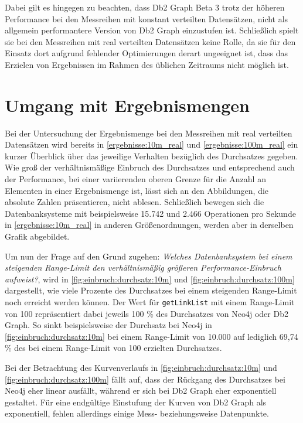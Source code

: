 Dabei gilt es hingegen zu beachten, dass Db2 Graph Beta 3 trotz der höheren Performance bei den Messreihen mit konstant verteilten Datensätzen, nicht als allgemein performantere Version von Db2 Graph einzustufen ist. Schließlich spielt sie bei den Messreihen mit real verteilten Datensätzen keine Rolle, da sie für den Einsatz dort aufgrund fehlender Optimierungen derart ungeeignet ist, dass das Erzielen von Ergebnissen im Rahmen des üblichen Zeitraums nicht möglich ist.

\section{Umgang mit Ergebnismengen}
\label{auswertung:ergebnismenge}
Bei der Untersuchung der Ergebnismenge bei den Messreihen mit real verteilten Datensätzen wird bereits in \autoref{ergebnisse:10m_real} und \ref{ergebnisse:100m_real} ein kurzer Überblick über das jeweilige Verhalten bezüglich des Durchsatzes gegeben. Wie groß der verhältnismäßige Einbruch des Durchsatzes und entsprechend auch der Performance, bei einer variierenden oberen Grenze für die Anzahl an Elementen in einer Ergebnismenge ist, lässt sich an den Abbildungen, die absolute Zahlen präsentieren, nicht ablesen. Schließlich bewegen sich die Datenbanksysteme mit beispielsweise 15.742 und 2.466 Operationen pro Sekunde in \autoref{ergebnisse:10m_real} in anderen Größenordnungen, werden aber in derselben Grafik abgebildet. 

Um nun der Frage auf den Grund zugehen: \textit{Welches Datenbanksystem bei einem steigenden Range-Limit den verhältnismäßig größeren Performance-Einbruch aufweist?}, wird in \autoref{fig:einbruch:durchsatz:10m} und \ref{fig:einbruch:durchsatz:100m} dargestellt, wie viele Prozente des Durchsatzes bei einem steigenden Range-Limit noch erreicht werden können. Der Wert für \texttt{getLinkList} mit einem Range-Limit von 100 repräsentiert dabei jeweils 100 \% des Durchsatzes von Neo4j oder Db2 Graph. So sinkt beispielsweise der Durchsatz bei Neo4j in \autoref{fig:einbruch:durchsatz:10m} bei einem Range-Limit von 10.000 auf lediglich 69,74 \% des bei einem Range-Limit von 100 erzielten Durchsatzes. 

Bei der Betrachtung des Kurvenverlaufs in \autoref{fig:einbruch:durchsatz:10m} und \ref{fig:einbruch:durchsatz:100m} fällt auf, dass der Rückgang des Durchsatzes bei Neo4j eher linear ausfällt, während er sich bei Db2 Graph eher exponentiell gestaltet. Für eine endgültige Einstufung der Kurven von Db2 Graph als exponentiell, fehlen allerdings einige Mess- beziehungsweise Datenpunkte.

